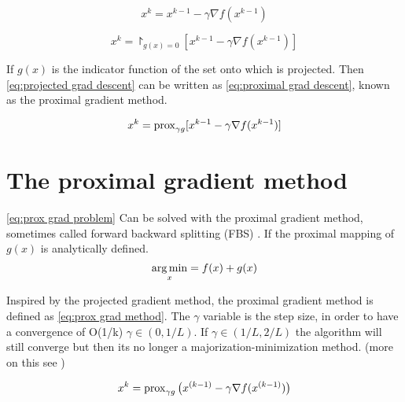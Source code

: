 		\begin{equation}
			x^k = x^{k-1} - \gamma \nabla f(x^{k-1})
			\label{eq:grad descent}
		\end{equation}
		
		\begin{equation}
			x^k = \project_{g(x)=0}[ x^{k-1} - \gamma \nabla f(x^{k-1})]
			\label{eq:projected grad descent}
		\end{equation}
		
		If $g(x)$ is the indicator function of the set onto which is projected. Then  \eqref{eq:projected grad descent} can be written as \eqref{eq:proximal grad descent}, known as the proximal gradient method.
		
		\begin{equation}
				x^k = \operatorname{prox}_{\gamma g}[ x^{k-1} - \gamma \nabla f(x^{k-1})]
			\label{eq:proximal grad descent}
		\end{equation}
	
	\section{The proximal gradient method}
		\eqref{eq:prox grad problem} Can be solved with the proximal gradient method, sometimes called forward backward splitting (FBS) . If the proximal mapping of $g(x)$ is analytically defined. 
			\begin{equation}
			\underset{x}{\operatorname*{arg\,min}} = f(x) + g(x)
			\label{eq:prox grad problem}
			\end{equation}
		
		Inspired by the projected gradient method, the proximal gradient method is defined as \eqref{eq:prox grad method}. The $\gamma$ variable is the step size, in order to have a convergence of O(1/k) $\gamma \in(0,1/L)$. If $\gamma \in (1/L,2/L)$ the algorithm will still converge but then its no longer a majorization-minimization method. (more on this see \cite{NealParikh})
		
		\begin{equation}
			x^k = \operatorname{prox}_{\gamma g}\big( x^{(k-1)}- \gamma \nabla f(x^{(k-1)})\big)
			\label{eq:prox grad method}
		\end{equation}	
	
